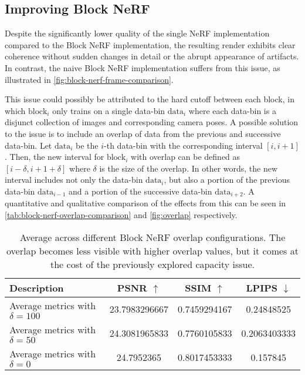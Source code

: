 \subsection{Improving Block NeRF}
Despite the significantly lower quality of the single NeRF implementation compared to the Block NeRF implementation, the resulting render exhibits clear coherence without sudden changes in detail or the abrupt appearance of artifacts. In contrast, the naive Block NeRF implementation suffers from this issue, as illustrated in \autoref{fig:block-nerf-frame-comparison}.



This issue could possibly be attributed to the hard cutoff between each block, in which $\text{block}_i$ only trains on a single data-bin $\text{data}_i$ where each data-bin is a disjunct collection of images and corresponding camera poses. A possible solution to the issue is to include an overlap of data from the previous and successive data-bin. Let $\text{data}_i$ be the $i$-th data-bin with the corresponding interval $[i, {i+1}]$. Then, the new interval for $\text{block}_i$ with overlap can be defined as $[i - \delta, {i+1} + \delta]$ where $\delta$ is the size of the overlap. In other words, the new interval includes not only the data-bin $\text{data}_i$, but also a portion of the previous data-bin $\text{data}_{i-1}$ and a portion of the successive data-bin $\text{data}_{i+2}$. A quantitative and qualitative comparison of the effects from this can be seen in \autoref{tab:block-nerf-overlap-comparison} and \autoref{fig:overlap} respectively.

\begin{table}[ht]
\centering
\setlength{\tabcolsep}{6pt}
\renewcommand{\arraystretch}{1.5}
\begin{tabular}{l | C{2.2} C{1.3} C{1.3}}
\hline
\textbf{Description} & \textbf{PSNR $\uparrow$} & \textbf{SSIM $\uparrow$} & \textbf{LPIPS $\downarrow$} \\
\hline
Average metrics with $\delta = 100$ &23.7983296667 &0.7459294167 &0.24848525 \\
Average metrics with $\delta = 50$  & 24.3081965833 & 0.7760105833 & 0.2063403333 \\
Average metrics with $\delta = 0$ &24.7952365 &0.8017453333 &0.157845 \\
\hline
\end{tabular}
\caption{Average across different Block NeRF overlap configurations. The overlap becomes less visible with higher overlap values, but it comes at the cost of the previously explored capacity issue.}
\label{tab:block-nerf-overlap-comparison}
\end{table}


